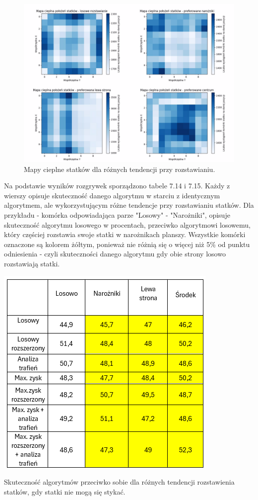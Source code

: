 \begin{figure}[!h]
    \label{fig:bias-benchmark}
    \centering \includegraphics[width=1\linewidth]{img/biases.jpg}
    \caption{Mapy cieplne statków dla różnych tendencji przy rozstawianiu.}
\end{figure}

Na podstawie wyników rozgrywek sporządzono tabele 7.14 i 7.15. Każdy z wierszy opisuje skuteczność danego algorytmu w starciu z identycznym algorytmem, ale wykorzystującym różne tendencje przy rozstawianiu statków. Dla przykładu - komórka odpowiadająca parze "Losowy" - "Narożniki", opisuje skuteczność algorytmu losowego w procentach, przeciwko algorytmowi losowemu, który częściej rozstawia swoje statki w narożnikach planszy. Wszystkie komórki oznaczone są kolorem żółtym, ponieważ nie różnią się o więcej niż 5\% od punktu odniesienia - czyli skuteczności danego algorytmu gdy obie strony losowo rozstawiają statki.

\begin{table}[!h]
    \label{fig:biases-cant-touch}
    \centering \includegraphics[width=0.7\linewidth]{img/bias_result_cant_touch.png}
    \caption{Skuteczność algorytmów przeciwko sobie dla różnych tendencji rozstawienia statków, gdy statki nie mogą się stykać.}
\end{table}

